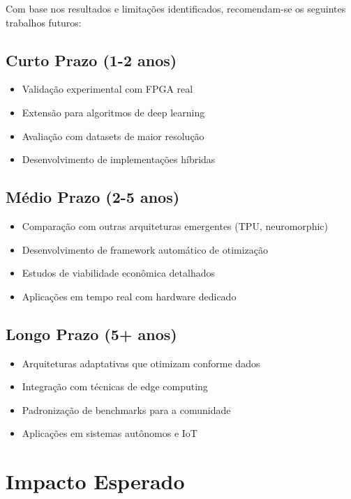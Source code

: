 Com base nos resultados e limitações identificados, recomendam-se os seguintes trabalhos futuros:

\subsection{Curto Prazo (1-2 anos)}
\begin{itemize}
    \item Validação experimental com FPGA real
    \item Extensão para algoritmos de deep learning
    \item Avaliação com datasets de maior resolução
    \item Desenvolvimento de implementações híbridas
\end{itemize}

\subsection{Médio Prazo (2-5 anos)}
\begin{itemize}
    \item Comparação com outras arquiteturas emergentes (TPU, neuromorphic)
    \item Desenvolvimento de framework automático de otimização
    \item Estudos de viabilidade econômica detalhados
    \item Aplicações em tempo real com hardware dedicado
\end{itemize}

\subsection{Longo Prazo (5+ anos)}
\begin{itemize}
    \item Arquiteturas adaptativas que otimizam conforme dados
    \item Integração com técnicas de edge computing
    \item Padronização de benchmarks para a comunidade
    \item Aplicações em sistemas autônomos e IoT
\end{itemize}

\section{Impacto Esperado}\label{sec:impacto_esperado}

